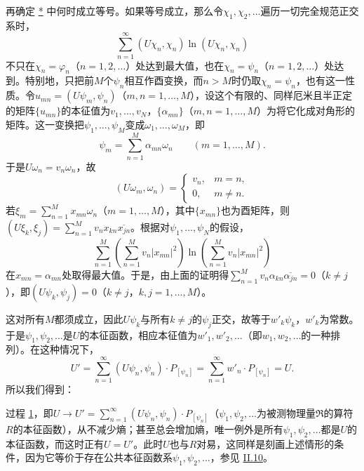\documentclass[fontsize=13pt,twoside,openany,headings=normal,parskip=false,bookmarkpackage=false,DIV=calc]{scrbook}
\begin{document}
再确定 \hyperref[eq:V.3.star]{*} 中何时成立等号。如果等号成立，那么令$\chi_1,\allowbreak \chi_2,\allowbreak \ldots$遍历一切完全规范正交系时，
\[
\sum_{n=1}^{\infty}(U\chi_n,\chi_n)\ln(U\chi_n,\chi_n)
\]
不只在$\chi_n=\varphi_n$（$n=1,\allowbreak 2,\allowbreak \ldots$）处达到最大值，也在$\chi_n=\psi_n$（$n=1,\allowbreak 2,\allowbreak \ldots$）处达到。特别地，只把前$M$个$\psi_n$相互作酉变换，而$n>M$时仍取$\chi_n=\psi_n$，也有这一性质。令$u_{mn}=(U\psi_m,\allowbreak \psi_n)$（$m,\allowbreak n=1,\allowbreak \ldots,\allowbreak M$），设这个有限的、同样厄米且半正定的矩阵$\{u_{mn}\}$的本征值为$v_1,\allowbreak \ldots,\allowbreak v_N$，$\{\alpha_{mn}\}$（$m,\allowbreak n=1,\allowbreak \ldots,\allowbreak M$）为将它化成对角形的矩阵。这一变换把$\psi_1,\allowbreak \ldots,\allowbreak \psi_M$变成$\omega_1,\allowbreak \ldots,\allowbreak \omega_M$，即
\[
\psi_m=\sum_{n=1}^M\alpha_{mn}\omega_n\qquad(m=1,\ldots,M).
\]
于是$U\omega_n=v_n\omega_n$，故
\[
(U\omega_m,\omega_n)=\begin{cases}v_n,&m=n,\\0,&m\ne n.\end{cases}
\]
若$\xi_m=\sum_{n=1}^Mx_{mn}\omega_n$（$m=1,\allowbreak \ldots,\allowbreak M$），其中$\{x_{mn}\}$也为酉矩阵，则$(U\xi_k,\allowbreak \xi_j)=\sum_{n=1}^Mv_nx_{kn}\overline{x_{jn}}$。根据对$\psi_1,\allowbreak \ldots,\allowbreak \psi_N$的假设，
\[
\sum_{n=1}^M\left(\sum_{n=1}^Mv_n|x_{mn}|^2\right)\ln\left(\sum_{n=1}^Mv_n|x_{mn}|^2\right)
\]
在$x_{mn}=\alpha_{mn}$处取得最大值。于是，由上面的证明得$\sum_{n=1}^Mv_n\alpha_{kn}\overline{\alpha_{jn}}=0$（$k\ne j$），即$(U\psi_k,\allowbreak \psi_j)=0$（$k\ne j$，$k,\allowbreak j=1,\allowbreak \ldots,\allowbreak M$）。

\hypertarget{origpage-206}{}\label{origpage-206}这对所有$M$都须成立，因此$U\psi_k$与所有$k\ne j$的$\psi_j$正交，故等于$w'_k\psi_k$，$w'_k$为常数。于是$\psi_1,\allowbreak \psi_2,\allowbreak \ldots$是$U$的本征函数，相应本征值为$w'_1,\allowbreak w'_2,\allowbreak \ldots$（即$w_1,\allowbreak w_2,\allowbreak \ldots$的一种排列）。在这种情况下，
\[
U'=\sum_{n=1}^{\infty}(U\psi_n,\psi_n)\cdot P_{[\psi_n]}
=\sum_{n=1}^{\infty}w'_n\cdot P_{[\psi_n]}=U.
\]
所以我们得到：

过程 \hyperref[eq:V.1.1]{1}，即$U\to U'=\sum_{n=1}^{\infty}(U\psi_n,\allowbreak \psi_n)\cdot P_{[\psi_n]}$（$\psi_1,\allowbreak \psi_2,\allowbreak \ldots$为被测物理量$\mathfrak R$的算符$R$的本征函数），从不减少熵；甚至总会增加熵，唯一例外是所有$\psi_1,\allowbreak \psi_2,\allowbreak \ldots$都是$U$的本征函数，而这时正有$U=U'$。此时$U$也与$R$对易，这同样是刻画上述情形的条件，因为它等价于存在公共本征函数系$\psi_1,\allowbreak \psi_2,\allowbreak \ldots$，参见 \hyperref[sec:II.10]{II.10}。
\end{document}
